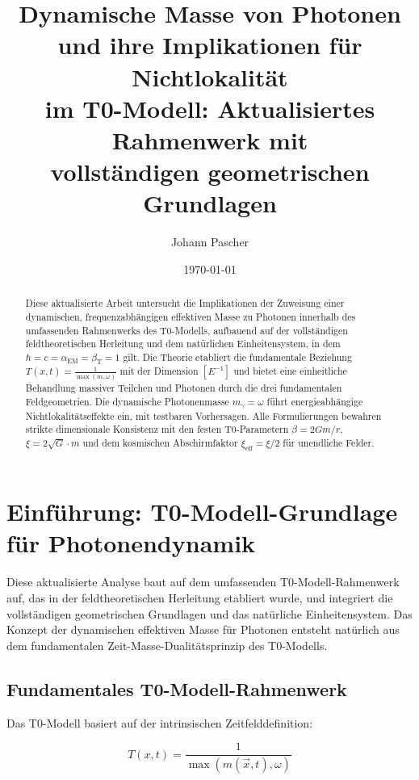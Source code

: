 \documentclass[12pt,a4paper]{article}
\title{Dynamische Masse von Photonen und ihre Implikationen für Nichtlokalität \\ im T0-Modell: Aktualisiertes Rahmenwerk mit \\ vollständigen geometrischen Grundlagen}
\author{Johann Pascher}
\date{\today}
\newcommand{\Tfield}{T(x,t)}
\begin{document}
	
	\maketitle
	
	\begin{abstract}
		Diese aktualisierte Arbeit untersucht die Implikationen der Zuweisung einer dynamischen, frequenzabhängigen effektiven Masse zu Photonen innerhalb des umfassenden Rahmenwerks des T0-Modells, aufbauend auf der vollständigen feldtheoretischen Herleitung und dem natürlichen Einheitensystem, in dem $\hbar = c = \alpha_{\text{EM}} = \beta_{\text{T}} = 1$ gilt. Die Theorie etabliert die fundamentale Beziehung $\Tfield = \frac{1}{\max(m, \omega)}$ mit der Dimension $[E^{-1}]$ und bietet eine einheitliche Behandlung massiver Teilchen und Photonen durch die drei fundamentalen Feldgeometrien. Die dynamische Photonenmasse $m_\gamma = \omega$ führt energieabhängige Nichtlokalitätseffekte ein, mit testbaren Vorhersagen.  Alle Formulierungen bewahren strikte dimensionale Konsistenz mit den festen T0-Parametern $\beta = 2Gm/r$, $\xi = 2\sqrt{G} \cdot m$ und dem kosmischen Abschirmfaktor $\xi_{\text{eff}} = \xi/2$ für unendliche Felder.
	\end{abstract}
	
	\tableofcontents
	\newpage
	
	\section{Einführung: T0-Modell-Grundlage für Photonendynamik}
	
	Diese aktualisierte Analyse baut auf dem umfassenden T0-Modell-Rahmenwerk auf, das in der feldtheoretischen Herleitung etabliert wurde, und integriert die vollständigen geometrischen Grundlagen und das natürliche Einheitensystem. Das Konzept der dynamischen effektiven Masse für Photonen entsteht natürlich aus dem fundamentalen Zeit-Masse-Dualitätsprinzip des T0-Modells.
	
	\subsection{Fundamentales T0-Modell-Rahmenwerk}
	
	Das T0-Modell basiert auf der intrinsischen Zeitfelddefinition:
	
	\begin{equation}
		\boxed{\Tfield = \frac{1}{\max(m(\vec{x},t), \omega)}}
		\label{eq:intrinsic_time_field}
	\end{equation}
	
\end{document}
